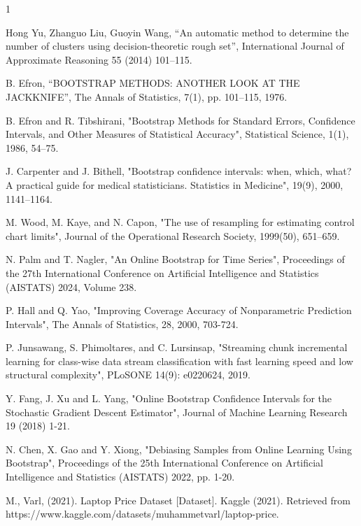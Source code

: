 \documentclass[a4paper,fleqn]{cas-dc}
\begin{document}
\begin{thebibliography}{1}


Hong Yu, Zhanguo Liu, Guoyin Wang, ``An automatic method to determine the number of clusters using
decision-theoretic rough set'', International Journal of Approximate Reasoning 55 (2014) 101–115.

B. Efron, ``BOOTSTRAP METHODS: ANOTHER LOOK AT THE JACKKNIFE'', The Annals of Statistics, 7(1), pp. 
101–115, 1976.

B. Efron and R. Tibshirani, "Bootstrap Methods for Standard Errors, Confidence Intervals, 
and Other Measures of Statistical Accuracy", Statistical Science, 1(1), 1986, 54–75. 

J. Carpenter and J. Bithell, "Bootstrap confidence intervals: when, which, what? 
A practical guide for medical statisticians. Statistics in Medicine", 19(9), 2000, 1141–1164. 

M. Wood, M. Kaye, and N. Capon, "The use of resampling for estimating control chart limits", 
Journal of the Operational Research Society, 1999(50), 651–659.

N. Palm and T. Nagler, "An Online Bootstrap for Time Series", Proceedings of the 27th International 
Conference on Artificial Intelligence and Statistics (AISTATS) 2024, Volume 238.

P. Hall and Q. Yao, "Improving Coverage Accuracy of Nonparametric Prediction Intervals", The 
Annals of Statistics, 28, 2000, 703-724.

P. Junsawang, S. Phimoltares, and C. Lursinsap, "Streaming chunk incremental learning for
class-wise data stream classification with fast learning speed and low structural complexity", 
PLoSONE 14(9): e0220624, 2019.

Y. Fang, J. Xu and L. Yang, "Online Bootstrap Confidence Intervals for the Stochastic
Gradient Descent Estimator", Journal of Machine Learning Research 19 (2018) 1-21.

N. Chen, X. Gao and Y. Xiong, "Debiasing Samples from Online Learning Using Bootstrap", Proceedings of the 25th International Conference on Artificial Intelligence and Statistics (AISTATS) 2022, pp. 1-20. 

M., Varl, (2021). Laptop Price Dataset [Dataset]. Kaggle (2021). Retrieved from https://www.kaggle.com/datasets/muhammetvarl/laptop-price.


\end{thebibliography}
\end{document}
